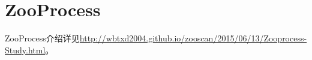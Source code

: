 \documentclass[12pt]{article}
\begin{document}
\section{ZooProcess}
ZooProcess介绍详见\url{http://wbtxd2004.github.io/zooscan/2015/06/13/Zooprocess-Study.html}。

%
%
%
%
\end{document}
